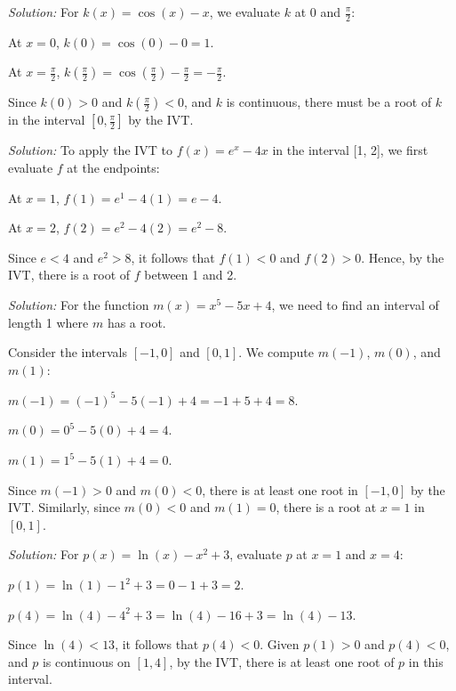 \documentclass[a4paper,12pt]{book}
\newenvironment{solution}[1][]
{\par\noindent\textit{Solution:} \rmfamily}{\medskip}
\begin{document}
\begin{solution}[\textbf{Problem 2}]
For \( k(x) = \cos(x) - x \), we evaluate \( k \) at \( 0 \) and \( \frac{\pi}{2} \):

At \( x = 0 \), \( k(0) = \cos(0) - 0 = 1 \).

At \( x = \frac{\pi}{2} \), \( k(\frac{\pi}{2}) = \cos(\frac{\pi}{2}) - \frac{\pi}{2} = -\frac{\pi}{2} \).

Since \( k(0) > 0 \) and \( k(\frac{\pi}{2}) < 0 \), and \( k \) is continuous, there must be a root of \( k \) in the interval \([0, \frac{\pi}{2}]\) by the IVT.
\end{solution}

\begin{solution}[\textbf{Problem 3}]
To apply the IVT to \( f(x) = e^x - 4x \) in the interval [1, 2], we first evaluate \( f \) at the endpoints:

At \( x = 1 \), \( f(1) = e^1 - 4(1) = e - 4 \).

At \( x = 2 \), \( f(2) = e^2 - 4(2) = e^2 - 8 \).

Since \( e < 4 \) and \( e^2 > 8 \), it follows that \( f(1) < 0 \) and \( f(2) > 0 \). Hence, by the IVT, there is a root of \( f \) between 1 and 2.
\end{solution}

\begin{solution}[\textbf{Problem 4}]
For the function \( m(x) = x^5 - 5x + 4 \), we need to find an interval of length 1 where \( m \) has a root. 

Consider the intervals \([-1, 0]\) and \([0, 1]\). We compute \( m(-1) \), \( m(0) \), and \( m(1) \):

\( m(-1) = (-1)^5 - 5(-1) + 4 = -1 + 5 + 4 = 8 \).

\( m(0) = 0^5 - 5(0) + 4 = 4 \).

\( m(1) = 1^5 - 5(1) + 4 = 0 \).

Since \( m(-1) > 0 \) and \( m(0) < 0 \), there is at least one root in \([-1, 0]\) by the IVT. Similarly, since \( m(0) < 0 \) and \( m(1) = 0 \), there is a root at \( x = 1 \) in \([0, 1]\).
\end{solution}

\begin{solution}[\textbf{Problem 5}]
For \( p(x) = \ln(x) - x^2 + 3 \), evaluate \( p \) at \( x = 1 \) and \( x = 4 \):

\( p(1) = \ln(1) - 1^2 + 3 = 0 - 1 + 3 = 2 \).

\( p(4) = \ln(4) - 4^2 + 3 = \ln(4) - 16 + 3 = \ln(4) - 13 \).

Since \( \ln(4) < 13 \), it follows that \( p(4) < 0 \). Given \( p(1) > 0 \) and \( p(4) < 0 \), and \( p \) is continuous on \([1, 4]\), by the IVT, there is at least one root of \( p \) in this interval.
\end{solution}
\end{document}
